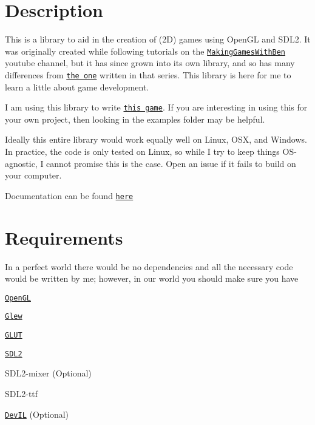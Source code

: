 \href{https://travis-ci.org/NivenT/jubilant-funicular}{\tt }

\section*{Description}

This is a library to aid in the creation of (2D) games using Open\+GL and S\+D\+L2. It was originally created while following tutorials on the \href{https://www.youtube.com/channel/UCL5m1_llmeiAdZMo_ZanIvg}{\tt Making\+Games\+With\+Ben} youtube channel, but it has since grown into its own library, and so has many differences from \href{https://github.com/Barnold1953/GraphicsTutorials}{\tt the one} written in that series. This library is here for me to learn a little about game development.

I am using this library to write \href{https://github.com/NivenT/Planet}{\tt this game}. If you are interesting in using this for your own project, then looking in the {\ttfamily examples} folder may be helpful.

Ideally this entire library would work equally well on Linux, O\+SX, and Windows. In practice, the code is only tested on Linux, so while I try to keep things O\+S-\/agnostic, I cannot promise this is the case. Open an issue if it fails to build on your computer.

Documentation can be found \href{https://nivent.github.io/jubilant-funicular/html/index.html}{\tt here}

\section*{Requirements}

In a perfect world there would be no dependencies and all the necessary code would be written by me; however, in our world you should make sure you have


\begin{DoxyItemize}
\item \href{https://www.opengl.org/}{\tt Open\+GL}
\begin{DoxyItemize}
\item \href{http://glew.sourceforge.net/}{\tt Glew}
\item \href{http://freeglut.sourceforge.net/}{\tt G\+L\+UT}
\end{DoxyItemize}
\item \href{https://www.libsdl.org/download-2.0.php}{\tt S\+D\+L2}
\begin{DoxyItemize}
\item S\+D\+L2-\/mixer (Optional)
\item S\+D\+L2-\/ttf
\end{DoxyItemize}
\item \href{http://openil.sourceforge.net/}{\tt Dev\+IL} (Optional)
\end{DoxyItemize}

